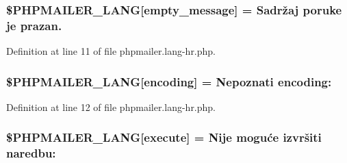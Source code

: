 \subsubsection[{\texorpdfstring{\$\+P\+H\+P\+M\+A\+I\+L\+E\+R\+\_\+\+L\+A\+NG}{$PHPMAILER_LANG}}]{\setlength{\rightskip}{0pt plus 5cm}\$P\+H\+P\+M\+A\+I\+L\+E\+R\+\_\+\+L\+A\+NG\mbox{[}\textquotesingle{}empty\+\_\+message\textquotesingle{}\mbox{]} = \textquotesingle{}Sadržaj poruke je prazan.\textquotesingle{}}\hypertarget{phpmailer_8lang-hr_8php_a33772099f637c9d6c2cd7425e0e37fed}{}\label{phpmailer_8lang-hr_8php_a33772099f637c9d6c2cd7425e0e37fed}


Definition at line 11 of file phpmailer.\+lang-\/hr.\+php.

\subsubsection[{\texorpdfstring{\$\+P\+H\+P\+M\+A\+I\+L\+E\+R\+\_\+\+L\+A\+NG}{$PHPMAILER_LANG}}]{\setlength{\rightskip}{0pt plus 5cm}\$P\+H\+P\+M\+A\+I\+L\+E\+R\+\_\+\+L\+A\+NG\mbox{[}\textquotesingle{}encoding\textquotesingle{}\mbox{]} = \textquotesingle{}Nepoznati encoding\+: \textquotesingle{}}\hypertarget{phpmailer_8lang-hr_8php_a817f7283f3d54c970a0c10305cc668cc}{}\label{phpmailer_8lang-hr_8php_a817f7283f3d54c970a0c10305cc668cc}


Definition at line 12 of file phpmailer.\+lang-\/hr.\+php.

\subsubsection[{\texorpdfstring{\$\+P\+H\+P\+M\+A\+I\+L\+E\+R\+\_\+\+L\+A\+NG}{$PHPMAILER_LANG}}]{\setlength{\rightskip}{0pt plus 5cm}\$P\+H\+P\+M\+A\+I\+L\+E\+R\+\_\+\+L\+A\+NG\mbox{[}\textquotesingle{}execute\textquotesingle{}\mbox{]} = \textquotesingle{}Nije moguće izvršiti naredbu\+: \textquotesingle{}}\hypertarget{phpmailer_8lang-hr_8php_a668217a9563a168f30f2a8548b6ed5a9}{}\label{phpmailer_8lang-hr_8php_a668217a9563a168f30f2a8548b6ed5a9}


